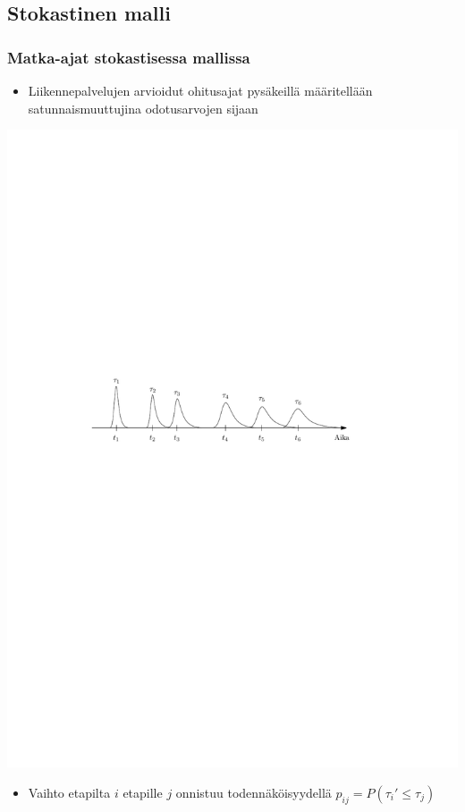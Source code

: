 \documentclass{beamer}
\begin{document}
\subsection{Stokastinen malli}
\begin{frame}
  \frametitle{Matka-ajat stokastisessa mallissa} 
  \begin{itemize}
   \item 
    Liikennepalvelujen arvioidut ohitusajat pysäkeillä määritellään satunnaismuuttujina odotusarvojen sijaan
\end{itemize}
     \begin{center}
     \includegraphics[scale=0.6]{stokvsdet02}
      \end{center}
\begin{itemize}
    \item
    Vaihto etapilta $i$ etapille $j$ onnistuu todennäköisyydellä $p_{ij} = P(\tau_i' \leq \tau_j)$

\end{itemize}
\end{frame}
\end{document}
